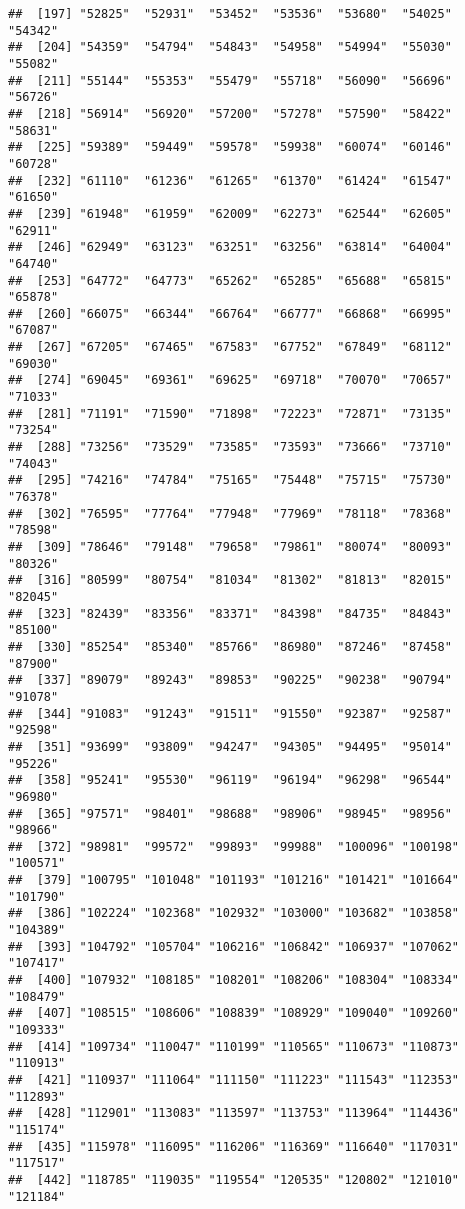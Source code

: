 \documentclass[]{article}
\begin{document}
\begin{verbatim}
##  [197] "52825"  "52931"  "53452"  "53536"  "53680"  "54025"  "54342" 
##  [204] "54359"  "54794"  "54843"  "54958"  "54994"  "55030"  "55082" 
##  [211] "55144"  "55353"  "55479"  "55718"  "56090"  "56696"  "56726" 
##  [218] "56914"  "56920"  "57200"  "57278"  "57590"  "58422"  "58631" 
##  [225] "59389"  "59449"  "59578"  "59938"  "60074"  "60146"  "60728" 
##  [232] "61110"  "61236"  "61265"  "61370"  "61424"  "61547"  "61650" 
##  [239] "61948"  "61959"  "62009"  "62273"  "62544"  "62605"  "62911" 
##  [246] "62949"  "63123"  "63251"  "63256"  "63814"  "64004"  "64740" 
##  [253] "64772"  "64773"  "65262"  "65285"  "65688"  "65815"  "65878" 
##  [260] "66075"  "66344"  "66764"  "66777"  "66868"  "66995"  "67087" 
##  [267] "67205"  "67465"  "67583"  "67752"  "67849"  "68112"  "69030" 
##  [274] "69045"  "69361"  "69625"  "69718"  "70070"  "70657"  "71033" 
##  [281] "71191"  "71590"  "71898"  "72223"  "72871"  "73135"  "73254" 
##  [288] "73256"  "73529"  "73585"  "73593"  "73666"  "73710"  "74043" 
##  [295] "74216"  "74784"  "75165"  "75448"  "75715"  "75730"  "76378" 
##  [302] "76595"  "77764"  "77948"  "77969"  "78118"  "78368"  "78598" 
##  [309] "78646"  "79148"  "79658"  "79861"  "80074"  "80093"  "80326" 
##  [316] "80599"  "80754"  "81034"  "81302"  "81813"  "82015"  "82045" 
##  [323] "82439"  "83356"  "83371"  "84398"  "84735"  "84843"  "85100" 
##  [330] "85254"  "85340"  "85766"  "86980"  "87246"  "87458"  "87900" 
##  [337] "89079"  "89243"  "89853"  "90225"  "90238"  "90794"  "91078" 
##  [344] "91083"  "91243"  "91511"  "91550"  "92387"  "92587"  "92598" 
##  [351] "93699"  "93809"  "94247"  "94305"  "94495"  "95014"  "95226" 
##  [358] "95241"  "95530"  "96119"  "96194"  "96298"  "96544"  "96980" 
##  [365] "97571"  "98401"  "98688"  "98906"  "98945"  "98956"  "98966" 
##  [372] "98981"  "99572"  "99893"  "99988"  "100096" "100198" "100571"
##  [379] "100795" "101048" "101193" "101216" "101421" "101664" "101790"
##  [386] "102224" "102368" "102932" "103000" "103682" "103858" "104389"
##  [393] "104792" "105704" "106216" "106842" "106937" "107062" "107417"
##  [400] "107932" "108185" "108201" "108206" "108304" "108334" "108479"
##  [407] "108515" "108606" "108839" "108929" "109040" "109260" "109333"
##  [414] "109734" "110047" "110199" "110565" "110673" "110873" "110913"
##  [421] "110937" "111064" "111150" "111223" "111543" "112353" "112893"
##  [428] "112901" "113083" "113597" "113753" "113964" "114436" "115174"
##  [435] "115978" "116095" "116206" "116369" "116640" "117031" "117517"
##  [442] "118785" "119035" "119554" "120535" "120802" "121010" "121184"

\end{verbatim}
\end{document}
